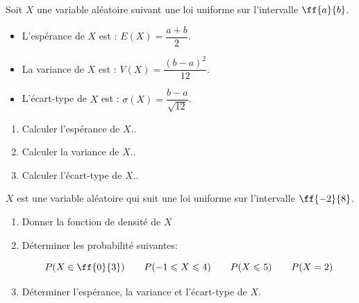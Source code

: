 \begin{propriete}{}
Soit $X$ une variable aléatoire suivant une loi uniforme sur l'intervalle $\ff{a}{b}$.

\begin{itemize}
	\item[$\bullet$] L'espérance de $X$ est : $E(X)=\dfrac{a+b}{2}$.
	\item[$\bullet$] La variance de $X$ est : $V(X)=\dfrac{(b-a)^2}{12}$.
	\item[$\bullet$] L'écart-type de $X$ est : $\sigma(X)=\dfrac{b-a}{\sqrt{12}}$.

\end{itemize}
\end{propriete}

\begin{exercice_cours}{}
\begin{enumerate}
	\item Calculer l'espérance de $X$.\hfill\reponseLigne[7cm]{}.
	\item Calculer la variance de $X$.\hfill\reponseLigne[7cm]{}.
	\item Calculer l'écart-type de $X$.\hfill\reponseLigne[7cm]{}.
\end{enumerate}
\end{exercice_cours}

\pagebreak

\begin{exercice_cours}[\quad]{}

	$X$ est une variable aléatoire qui suit une loi uniforme sur l'intervalle $\ff{-2}{8}$.

\begin{enumerate}
	\item Donner la fonction de densité de $X$ 
	\begin{blocvisiblex}[height=1.5]
{\quad}
\end{blocvisiblex}
	\item Déterminer les probabilité suivantes:
	
	$$P(X  \in \ff{0}{3}) \qquad P(-1\leqslant X \leqslant 4) \qquad P(X\leqslant 5)  \qquad P(X=2)$$
	
\begin{blocvisiblex}[height=2.]
{\quad}
\end{blocvisiblex}	
	\item Déterminer l'espérance, la variance et l'écart-type de $X$.
	
\begin{blocvisiblex}[height=2.]
{\quad}
\end{blocvisiblex}	
	
\end{enumerate}
\end{exercice_cours}

